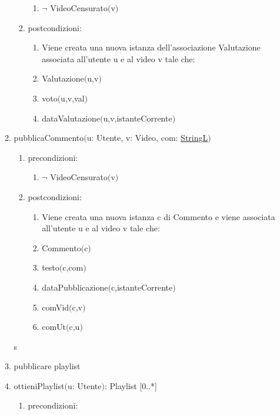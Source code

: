 \documentclass{article}
\begin{document}
\begin{enumerate}
\begin{enumerate}
\begin{enumerate}
\begin{enumerate}
                \item $\neg$ VideoCensurato$($v$)$
            \end{enumerate}
            \item postcondizioni:
            \begin{enumerate}
                \item Viene creata una nuova istanza dell'associazione Valutazione associata all'utente u e al video v tale che:
                \item Valutazione$($u,v$)$
                \item voto$($u,v,val$)$
                \item dataValutazione$($u,v,istanteCorrente$)$
            \end{enumerate}
        \end{enumerate}
        \item pubblicaCommento$($u: Utente, v: Video, com: \hyperref[sec:TipoStringL]{StringL}$)$
        \begin{enumerate}
            \item precondizioni:
            \begin{enumerate}
                \item $\neg$ VideoCensurato$($v$)$
            \end{enumerate}
            \item postcondizioni:
            \begin{enumerate}
                \item Viene creata una nuova istanza c di Commento e viene associata all'utente u e al video v tale che:
                \item Commento$($c$)$
                \item testo$($c,com$)$
                \item dataPubblicazione$($c,istanteCorrente$)$
                \item comVid$($c,v$)$
                \item comUt$($c,u$)$
            \end{enumerate}
        \end{enumerate}s
        \item pubblicare playlist
        \item ottieniPlaylist$($u: Utente$)$: Playlist [0..*]
        \begin{enumerate}
            \item precondizioni:
            \begin{enumerate}

\end{enumerate}
\end{enumerate}
\end{enumerate}
\end{enumerate}
\end{document}
